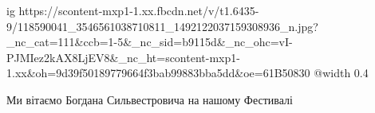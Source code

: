  
 
 
 
 

\ifcmt
  ig https://scontent-mxp1-1.xx.fbcdn.net/v/t1.6435-9/118590041_3546561038710811_1492122037159308936_n.jpg?_nc_cat=111&ccb=1-5&_nc_sid=b9115d&_nc_ohc=vI-PJMIez2kAX8LjEV8&_nc_ht=scontent-mxp1-1.xx&oh=9d39f50189779664f3bab99883bba5dd&oe=61B50830
  @width 0.4
\fi


Ми вітаємо Богдана Сильвестровича на нашому Фестивалі

